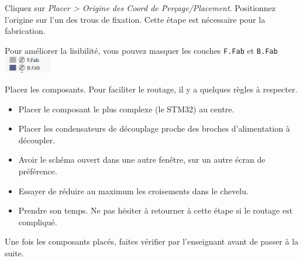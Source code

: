 \documentclass[12pt,%
addpoints,%
]{exam}
\begin{document}
\begin{questions}
	\question Cliquez sur \emph{Placer > Origine des Coord de Perçage/Placement}. Positionnez l'origine sur l'un des trous de fixation.
	Cette étape est nécessaire pour la fabrication.

	\question Pour améliorer la lisibilité, vous pouvez masquer les couches \texttt{F.Fab} et \texttt{B.Fab} \includegraphics[height=2em]{figures/kicad23.png}

	\question Placez les composants. Pour faciliter le routage, il y a quelques règles à respecter.
	\begin{itemize}
		\item Placer le composant le plus complexe (le STM32) au centre.
		\item Placer les condensateurs de découplage proche des broches d'alimentation à découpler.
		\item Avoir le schéma ouvert dans une autre fenêtre, sur un autre écran de préférence.
		\item Essayer de réduire au maximum les croisements dans le chevelu.
		\item Prendre son temps. Ne pas hésiter à retourner à cette étape si le routage est compliqué.
	\end{itemize}

	Une fois les composants placés, faites vérifier par l'enseignant avant de passer à la suite.
\end{questions}
\end{document}
